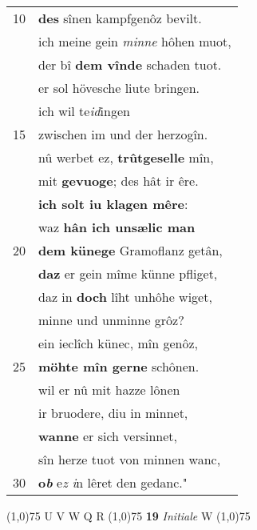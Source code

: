 \documentclass[8pt,a4paper,notitlepage]{article}
\begin{document}
\begin{table}[ht]
\begin{minipage}[t]{0.5\linewidth}
\begin{tabular}{rl}
10 & \textbf{des} sînen kampfgenôz bevilt.\\ 
 & ich meine gein \textit{minne} hôhen muot,\\ 
 & der bî \textbf{dem vînde} schaden tuot.\\ 
 & er sol hövesche liute bringen.\\ 
 & ich wil te\textit{id}ingen\\ 
15 & zwischen im und der herzogîn.\\ 
 & nû werbet ez, \textbf{trûtgeselle} mîn,\\ 
 & mit \textbf{gevuoge}; des hât ir êre.\\ 
 & \textbf{ich solt iu klagen mêre}:\\ 
 & waz \textbf{hân ich unsælic man}\\ 
20 & \textbf{dem künege} Gramoflanz getân,\\ 
 & \textbf{daz} er gein mîme künne pfliget,\\ 
 & daz in \textbf{doch} lîht unhôhe wiget,\\ 
 & minne und unminne grôz?\\ 
 & ein ieclîch künec, mîn genôz,\\ 
25 & \textbf{möhte mîn gerne} schônen.\\ 
 & wil er nû mit hazze lônen\\ 
 & ir bruodere, diu in minnet,\\ 
 & \textbf{wanne} er sich versinnet,\\ 
 & sîn herze tuot von minnen wanc,\\ 
30 & \textbf{o\textit{b}} e\textit{z i}n lêret den gedanc."\\ 
\end{tabular}
\scriptsize
\line(1,0){75} \newline
U V W Q R \newline
\line(1,0){75} \newline
\textbf{19} \textit{Initiale} W  \newline
\line(1,0){75} \newline

\end{minipage}
\end{table}
\end{document}
